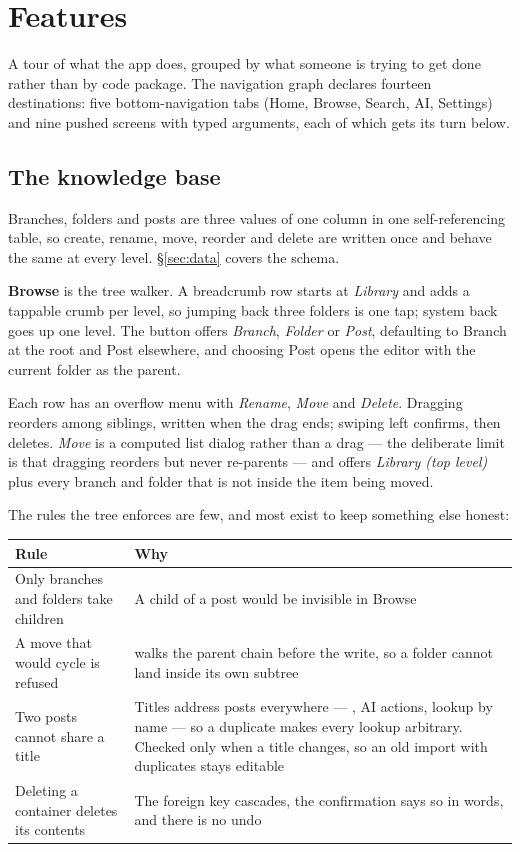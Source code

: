 \section{Features}
\label{sec:features}

A tour of what the app does, grouped by what someone is trying to get done rather than by code
package. The navigation graph declares fourteen destinations: five bottom-navigation tabs (Home,
Browse, Search, AI, Settings) and nine pushed screens with typed arguments, each of which gets its
turn below.

\subsection{The knowledge base}

Branches, folders and posts are three values of one  column in one self-referencing
 table, so create, rename, move, reorder and delete are written once and behave the
same at every level. \S\ref{sec:data} covers the schema.

\textbf{Browse} is the tree walker. A breadcrumb row starts at \emph{Library} and adds a tappable
crumb per level, so jumping back three folders is one tap; system back goes up one level. The
\code{+} button offers \emph{Branch}, \emph{Folder} or \emph{Post}, defaulting to Branch at the root
and Post elsewhere, and choosing Post opens the editor with the current folder as the parent.

Each row has an overflow menu with \emph{Rename}, \emph{Move} and \emph{Delete}. Dragging reorders
among siblings, written when the drag ends; swiping left confirms, then deletes. \emph{Move} is a
computed list dialog rather than a drag --- the deliberate limit is that dragging reorders but never
re-parents --- and  offers \emph{Library (top level)} plus every branch and
folder that is not inside the item being moved.

The rules the tree enforces are few, and most exist to keep something else honest:

\noindent
\begin{tabularx}{\linewidth}{L{4.6cm} X}
\toprule
\textbf{Rule} & \textbf{Why} \\
\midrule
Only branches and folders take children &
A child of a post would be invisible in Browse \\
\addlinespace
A move that would cycle is refused &
 walks the parent chain before the write, so a folder cannot land
inside its own subtree \\
\addlinespace
Two posts cannot share a title &
Titles address posts everywhere --- , AI actions, lookup by name --- so a
duplicate makes every lookup arbitrary. Checked only when a title changes, so an old import with
duplicates stays editable \\
\addlinespace
Deleting a container deletes its contents &
The foreign key cascades, the confirmation says so in words, and there is no undo \\
\bottomrule
\end{tabularx}

